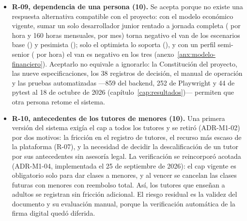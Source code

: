 \begin{itemize}
          (capítulo~\ref{cap:resultados}), y la prueba formal de punta a
          punta contra LiveKit real pasó sus nueve casos el 16 de octubre
          de 2026. Faltan la medición en celulares reales y la decisión de
          encendido. La respuesta es evitar: sin esas condiciones no se
          habilitan clases con menores, y el sistema lo impone con una
          opción de configuración que rechaza toda reserva o solicitud
          para un menor.
    \item \textbf{R-09, dependencia de una persona (10).} Se acepta
          porque no existe una respuesta alternativa compatible con el
          proyecto: con el modelo económico vigente, sumar un solo
          desarrollador junior rentado a jornada completa ( por hora
          y 160 horas mensuales,  por mes) torna negativo el
          \gls{van} de los escenarios base () y pesimista
          (); solo el optimista lo soporta (), y
          con un perfil semi-senior ( por hora) el \gls{van} es
          negativo en los tres (anexo~\ref{anx:modelo-financiero}). Aceptarlo no
          equivale a ignorarlo: la Constitución del proyecto, las nueve
          especificaciones, los 38 registros de decisión, el manual de
          operación y las pruebas automatizadas ---859 del backend, 252 de
          Playwright y 44 de pytest al 18 de octubre de 2026
          (capítulo~\ref{cap:resultados})--- permiten que otra persona retome
          el sistema.
    \item \textbf{R-10, antecedentes de los tutores de menores (10).}
          Una primera versión del sistema exigía el \gls{cap} a todos los
          tutores y se retiró (ADR-M1-02) por dos motivos: la fricción en
          el registro de tutores, el recurso más escaso de la plataforma
          (R-07), y la necesidad de decidir la descalificación de un tutor
          por sus antecedentes sin asesoría legal. La verificación se
          reincorporó acotada (ADR-M1-04, implementada el 25 de septiembre
          de 2026): el \gls{cap} vigente es obligatorio solo para dar
          clases a menores, y al vencer se cancelan las clases futuras con
          menores con reembolso total. Así, los tutores que enseñan a
          adultos se registran sin fricción adicional. El riesgo residual
          es la validez del documento y su evaluación manual, porque la
          verificación automática de la firma digital quedó diferida.
\end{itemize}

